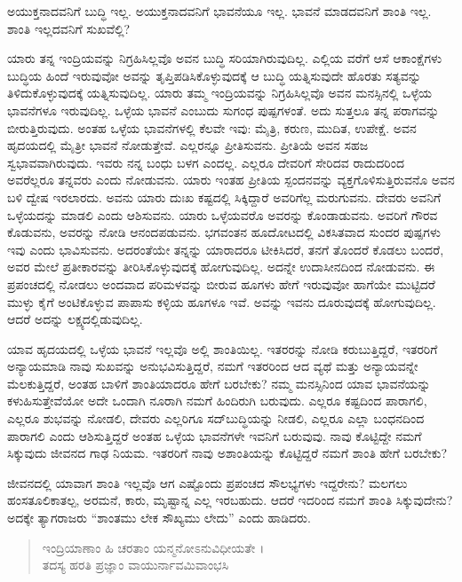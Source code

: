 {\small ಅಯುಕ್ತನಾದವನಿಗೆ ಬುದ್ಧಿ ಇಲ್ಲ. ಅಯುಕ್ತನಾದವನಿಗೆ ಭಾವನೆಯೂ ಇಲ್ಲ. ಭಾವನೆ ಮಾಡದವನಿಗೆ ಶಾಂತಿ ಇಲ್ಲ. ಶಾಂತಿ ಇಲ್ಲದವನಿಗೆ ಸುಖವೆಲ್ಲಿ?}

ಯಾರು ತನ್ನ ಇಂದ್ರಿಯವನ್ನು ನಿಗ್ರಹಿಸಿಲ್ಲವೊ ಅವನ ಬುದ್ಧಿ ಸರಿಯಾಗಿರುವುದಿಲ್ಲ. ಎಲ್ಲಿಯ ವರೆಗೆ ಆಸೆ ಆಕಾಂಕ್ಷೆಗಳು ಬುದ್ಧಿಯ ಹಿಂದೆ ಇರುವುವೋ ಅವನ್ನು ತೃಪ್ತಿಪಡಿಸಿಕೊಳ್ಳುವುದಕ್ಕೆ ಆ ಬುದ್ಧಿ ಯತ್ನಿಸುವುದೇ ಹೊರತು ಸತ್ಯವನ್ನು ತಿಳಿದುಕೊಳ್ಳುವುದಕ್ಕೆ ಯತ್ನಿಸುವುದಿಲ್ಲ. ಯಾರು ತಮ್ಮ ಇಂದ್ರಿಯವನ್ನು ನಿಗ್ರಹಿಸಿಲ್ಲವೊ ಅವನ ಮನಸ್ಸಿನಲ್ಲಿ ಒಳ್ಳೆಯ ಭಾವನೆಗಳೂ ಇರುವುದಿಲ್ಲ. ಒಳ್ಳೆಯ ಭಾವನೆ ಎಂಬುದು ಸುಗಂಧ ಪುಷ್ಪಗಳಂತೆ. ಅದು ಸುತ್ತಲೂ ತನ್ನ ಪರಾಗವನ್ನು ಬೀರುತ್ತಿರುವುದು. ಅಂತಹ ಒಳ್ಳೆಯ ಭಾವನೆಗಳಲ್ಲಿ ಕೆಲವೇ ಇವು: ಮೈತ್ರಿ, ಕರುಣ, ಮುದಿತ, ಉಪೇಕ್ಷೆ. ಅವನ ಹೃದಯದಲ್ಲಿ ಮೈತ್ರೀ ಭಾವನೆ ನೋಡುತ್ತೇವೆ. ಎಲ್ಲರನ್ನೂ ಪ್ರೀತಿಸುವನು. ಪ್ರೀತಿಯೆ ಅವನ ಸಹಜ ಸ್ವಭಾವವಾಗಿರುವುದು. ಇವರು ನನ್ನ ಬಂಧು ಬಳಗ ಎಂದಲ್ಲ. ಎಲ್ಲರೂ ದೇವರಿಗೆ ಸೇರಿದವ ರಾದುದರಿಂದ ಅವರೆಲ್ಲರೂ ತನ್ನವರು ಎಂದು ನೋಡುವನು. ಯಾರು ಇಂತಹ ಪ್ರೀತಿಯ ಸ್ಪಂದನವನ್ನು ವ್ಯಕ್ತಗೊಳಿಸುತ್ತಿರುವನೊ ಅವನ ಬಳಿ ದ್ವೇಷ ಇರಲಾರದು. ಅವನು ಯಾರು ದುಃಖ ಕಷ್ಟದಲ್ಲಿ ಸಿಕ್ಕಿದ್ದಾರೆ ಅವರಿಗೆಲ್ಲ ಮರುಗುವನು. ದೇವರು ಅವನಿಗೆ ಒಳ್ಳೆಯದನ್ನು ಮಾಡಲಿ ಎಂದು ಆಶಿಸುವನು. ಯಾರು ಒಳ್ಳೆಯವರೊ ಅವರನ್ನು ಕೊಂಡಾಡುವನು. ಅವರಿಗೆ ಗೌರವ ಕೊಡುವನು, ಅವರನ್ನು ನೋಡಿ ಆನಂದಪಡುವನು. ಭಗವಂತನ ಹೂದೋಟದಲ್ಲಿ ವಿಕಸಿತವಾದ ಸುಂದರ ಪುಷ್ಪಗಳು ಇವು ಎಂದು ಭಾವಿಸುವನು. ಅದರಂತೆಯೇ ತನ್ನನ್ನು ಯಾರಾದರೂ ಟೀಕಿಸಿದರೆ, ತನಗೆ ತೊಂದರೆ ಕೊಡಲು ಬಂದರೆ, ಅವರ ಮೇಲೆ ಪ್ರತೀಕಾರವನ್ನು ತೀರಿಸಿಕೊಳ್ಳುವುದಕ್ಕೆ ಹೋಗುವುದಿಲ್ಲ. ಅದನ್ನೇ ಉದಾಸೀನದಿಂದ ನೋಡುವನು. ಈ ಪ್ರಪಂಚದಲ್ಲಿ ನೋಡಲು ಅಂದವಾದ ಪರಿಮಳವನ್ನು ಬೀರುವ ಹೂಗಳು ಹೇಗೆ ಇರುವುವೋ ಹಾಗೆಯೇ ಮುಟ್ಟಿದರೆ ಮುಳ್ಳು ಕೈಗೆ ಅಂಟಿಕೊಳ್ಳುವ ಪಾಪಾಸು ಕಳ್ಳಿಯ ಹೂಗಳೂ ಇವೆ. ಅವನ್ನು ಇವನು ದೂರುವುದಕ್ಕೆ ಹೋಗುವುದಿಲ್ಲ. ಆದರೆ ಅದನ್ನು ಲಕ್ಷ್ಯದಲ್ಲಿಡುವುದಿಲ್ಲ.

ಯಾವ ಹೃದಯದಲ್ಲಿ ಒಳ್ಳೆಯ ಭಾವನೆ ಇಲ್ಲವೊ ಅಲ್ಲಿ ಶಾಂತಿಯಿಲ್ಲ. ಇತರರನ್ನು ನೋಡಿ ಕರುಬುತ್ತಿದ್ದರೆ, ಇತರರಿಗೆ ಅನ್ಯಾಯಮಾಡಿ ನಾವು ಸುಖವನ್ನು ಅನುಭವಿಸುತ್ತಿದ್ದರೆ, ನಮಗೆ ಇತರರಿಂದ ಆದ ವ್ಯಥೆ ಮತ್ತು ಅನ್ಯಾಯವನ್ನೇ ಮೆಲಕುತ್ತಿದ್ದರೆ, ಅಂತಹ ಬಾಳಿಗೆ ಶಾಂತಿಯಾದರೂ ಹೇಗೆ ಬರಬೇಕು? ನಮ್ಮ ಮನಸ್ಸಿನಿಂದ ಯಾವ ಭಾವನೆಯನ್ನು ಕಳುಹಿಸುತ್ತೇವೆಯೋ ಅದೇ ಒಂದಾಗಿ ನೂರಾಗಿ ನಮಗೆ ಹಿಂದಿರುಗಿ ಬರುವುದು. ಎಲ್ಲರೂ ಕಷ್ಟದಿಂದ ಪಾರಾಗಲಿ, ಎಲ್ಲರೂ ಶುಭವನ್ನು ನೋಡಲಿ, ದೇವರು ಎಲ್ಲರಿಗೂ ಸದ್​ಬುದ್ಧಿಯನ್ನು ನೀಡಲಿ, ಎಲ್ಲರೂ ಎಲ್ಲಾ ಬಂಧನದಿಂದ ಪಾರಾಗಲಿ ಎಂದು ಆಶಿಸುತ್ತಿದ್ದರೆ ಅಂತಹ ಒಳ್ಳೆಯ ಭಾವನೆಗಳೇ ಇವನಿಗೆ ಬರುವುವು. ನಾವು ಕೊಟ್ಟಿದ್ದೇ ನಮಗೆ ಸಿಕ್ಕುವುದು ಜೀವನದ ಗಾಢ ನಿಯಮ. ಇತರರಿಗೆ ನಾವು ಅಶಾಂತಿಯನ್ನು ಕೊಟ್ಟಿದ್ದರೆ ನಮಗೆ ಶಾಂತಿ ಹೇಗೆ ಬರಬೇಕು?

ಜೀವನದಲ್ಲಿ ಯಾವಾಗ ಶಾಂತಿ ಇಲ್ಲವೊ ಆಗ ಎಷ್ಟೊಂದು ಪ್ರಪಂಚದ ಸೌಲಭ್ಯಗಳು ಇದ್ದರೇನು? ಮಲಗಲು ಹಂಸತೂಲಿಕಾತಲ್ಪ, ಅರಮನೆ, ಕಾರು, ಮೃಷ್ಟಾನ್ನ ಎಲ್ಲ ಇರಬಹುದು. ಆದರೆ ಇದರಿಂದ ನಮಗೆ ಶಾಂತಿ ಸಿಕ್ಕುವುದೇನು? ಅದಕ್ಕೇ ತ್ಯಾಗರಾಜರು “ಶಾಂತಮು ಲೇಕ ಸೌಖ್ಯಮು ಲೇದು” ಎಂದು ಹಾಡಿದರು.

\begin{verse}
ಇಂದ್ರಿಯಾಣಾಂ ಹಿ ಚರತಾಂ ಯನ್ಮನೋಽನುವಿಧೀಯತೇ ।\\ತದಸ್ಯ ಹರತಿ ಪ್ರಜ್ಞಾಂ ವಾಯುರ್ನಾವಮಿವಾಂಭಸಿ 
\end{verse}

